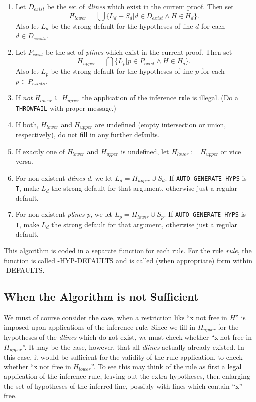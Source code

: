 \begin{enumerate}
\item Let $D_{exist}$ be the set of {\it dlines} which exist in the current proof.
Then set 
$$H_{lower} = \bigcup \{L_d - S_d | d \in D_{exist} \land
H \in H_d\}.$$
  Also let $L_d$ be the strong default for the
hypotheses of line $d$ for each $d\in D_{exists}$.

\item \label{latermodified} %
Let $P_{exist}$ be the set of {\it plines} which exist in the current proof.
Then set 
$$H_{upper} = \bigcap \{L_p |  p \in P_{exist} \land
H\in H_p\}.$$
Also let $L_p$ be the strong default for the
hypotheses of line $p$ for each $p\in P_{exists}$.

\item If {\it not}  $H_{lower} \subseteq H_{upper}$   the application of the inference
rule is illegal. (Do a {\tt THROWFAIL} with proper message.)

\item If both, $H_{lower}$ and $H_{upper}$ are undefined (empty intersection or union,
respectively), do not fill in any further defaults.

\item If exactly one of $H_{lower}$ and $H_{upper}$ is undefined, let $H_{lower} := H_{upper}$
or vice versa.

\item For non-existent {\it dlines} {\it d}, we let $L_d = H_{upper} \cup S_d$.
If {\tt AUTO-GENERATE-HYPS} is {\tt T}, make $L_d$ the strong default for that
argument, otherwise just a regular default.

\item For non-existent {\it plines} {\it p}, we let $L_p = H_{lower} \cup S_p$.
If {\tt AUTO-GENERATE-HYPS} is {\tt T}, make $L_d$ the strong default for that
argument, otherwise just a regular default.
\end{enumerate}

This algorithm is coded in a separate function for each rule.
For the rule {\it rule}, the function is called {-HYP-DEFAULTS}
and is called (when appropriate) form within {-DEFAULTS}.

\subsection{When the Algorithm is not Sufficient}

We must of course consider the case, when a restriction like
``x not free in $H$'' is imposed upon applications of the inference
rule.  Since we fill in $H_{upper}$ for the hypotheses of the {\it dlines} which
do not exist, we must check whether ``x not free in $H_{upper}$''.  It may
be the case, however, that all {\it dlines} actually already existed.  In this
case, it would be sufficient for the validity of the rule application, to check
whether ``x not free in $H_{lower}$''.  To see this may think of the rule as
first a legal application of the inference rule, leaving out the extra
hypotheses, then enlarging the set of hypotheses of the inferred line,
possibly with lines which contain ``x'' free.

